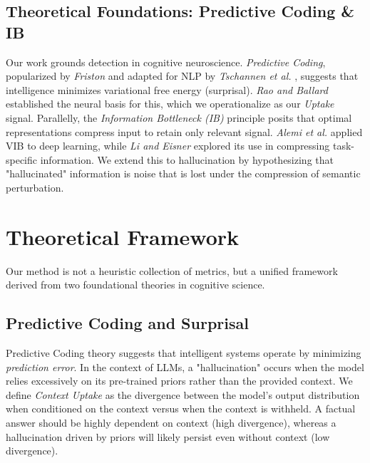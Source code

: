 \documentclass[11pt,letterpaper]{article}
\begin{document}
\subsection{Theoretical Foundations: Predictive Coding \& IB}
Our work grounds detection in cognitive neuroscience. \textit{Predictive Coding}, popularized by \textit{Friston} \cite{friston2010free} and adapted for NLP by \textit{Tschannen et al.} \cite{tschannen2018recent}, suggests that intelligence minimizes variational free energy (surprisal). \textit{Rao and Ballard} \cite{rao1999predictive} established the neural basis for this, which we operationalize as our \textit{Uptake} signal. Parallelly, the \textit{Information Bottleneck (IB)} principle \cite{tishby2000information, tishby2015deep}  posits that optimal representations compress input to retain only relevant signal. \textit{Alemi et al.} \cite{alemi2016deep} applied VIB to deep learning, while \textit{Li and Eisner} \cite{li2019specializing} explored its use in compressing task-specific information. We extend this to hallucination by hypothesizing that "hallucinated" information is noise that is lost under the compression of semantic perturbation.

\section{Theoretical Framework}

Our method is not a heuristic collection of metrics, but a unified framework derived from two foundational theories in cognitive science.

\subsection{Predictive Coding and Surprisal}
Predictive Coding theory suggests that intelligent systems operate by minimizing \textit{prediction error}. In the context of LLMs, a "hallucination" occurs when the model relies excessively on its pre-trained priors rather than the provided context. We define \textit{Context Uptake} as the divergence between the model's output distribution when conditioned on the context versus when the context is withheld. A factual answer should be highly dependent on context (high divergence), whereas a hallucination driven by priors will likely persist even without context (low divergence).
\end{document}
